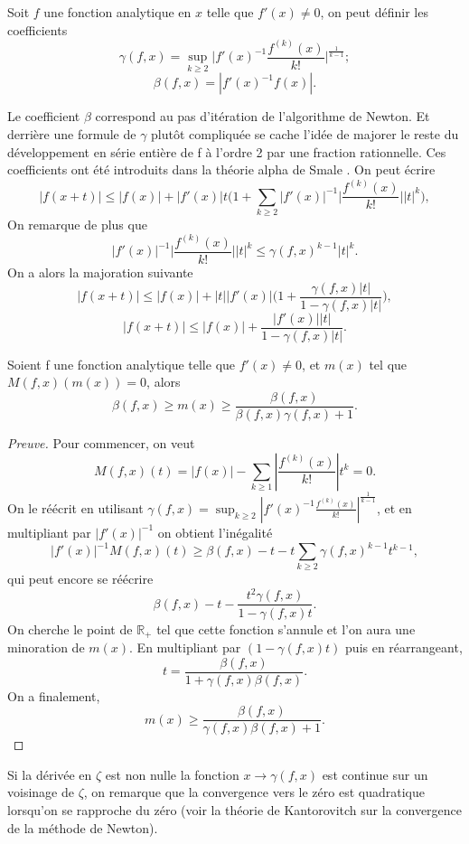 \documentclass[a4paper,10pt]{article}
\begin{document}
	\begin{definition}
		Soit $f$ une fonction analytique en $x$ telle que $f'(x)\neq0$, on peut définir les coefficients 
		\[\gamma(f,x)=\sup_{k \geq 2}\Big|f'(x)^{-1}\frac{f^{(k)}(x)}{k!}\Big|^{\frac{1}{k-1}};\]
		\[\beta(f,x)=|f'(x)^{-1}f(x)|.\]
	\end{definition}
	Le coefficient $\beta$ correspond au pas d'itération de l'algorithme de Newton. 
	Et derrière une formule de $\gamma$ plutôt compliquée se cache l'idée de majorer le reste du développement en série entière de f à l'ordre 2 par une fraction rationnelle. Ces coefficients ont été introduits dans la théorie alpha de Smale \cite{dedieu2006points}.
	On peut écrire 
	\[|f(x+t)|\leq |f(x)|+|f'(x)|t\Big(1+\sum_{k\geq2}|f'(x)|^{-1}\Big| \frac{f^{(k)}(x)}{k!}\Big||t|^k\Big),\]
	On remarque de plus que 
	\[|f'(x)|^{-1}\Big|\frac{f^{(k)}(x)}{k!}\Big||t|^k \leq \gamma(f,x)^{k-1}|t|^k.\]
	On a alors la majoration suivante
	\[|f(x+t)|\leq |f(x)|+|t||f'(x)|\Big(1+\frac{\gamma(f,x) |t|}{1-\gamma(f,x) |t|}\Big),\]
	\[|f(x+t)|\leq |f(x)|+\frac{|f'(x)||t|}{1-\gamma(f,x) |t|}.\]
	\begin{proposition}
		Soient f une fonction analytique telle que $f'(x)\neq 0$, et $m(x)$ tel que $M(f,x)(m(x))=0$, alors
		\[\beta(f,x) \geq m(x)\geq\frac{\beta(f,x)}{\beta(f,x)\gamma(f,x)+1}.\]
	\end{proposition}
	\begin{proof}[Preuve]
		
		Pour commencer, on veut  
		\[M(f,x)(t)=|f(x)|-\sum_{k\geq1}|\frac{f^{(k)}(x)}{k!}|t^{k}=0.\]
		On le réécrit en utilisant $\gamma(f,x)=\sup_{k \geq 2}|f'(x)^{-1}\frac{f^{(k)}(x)}{k!}|^{\frac{1}{k-1}}$, et en multipliant par $|f'(x)|^{-1}$ on obtient l'inégalité
		\[|f'(x)|^{-1}M(f,x)(t)\geq \beta(f,x)-t-t\sum_{k\geq2}\gamma(f,x)^{k-1}t^{k-1},\]
		qui peut encore se réécrire
		\[\beta(f,x)-t-\frac{t^2\gamma(f,x)}{1-\gamma(f,x) t}.\]
		On cherche le point de $\mathbb{R}_+$ tel que cette fonction s'annule et l'on aura une minoration de $m(x)$. En multipliant par $(1-\gamma(f,x) t)$ puis en réarrangeant,
		\[t=\frac{\beta(f,x)}{1+\gamma(f,x) \beta(f,x)}.\]
		On a finalement,
		\[m(x)\geq\frac{\beta(f,x)}{\gamma(f,x) \beta(f,x)+1}.\]
	\end{proof}
	Si la dérivée en $\zeta$ est non nulle la fonction $x\rightarrow \gamma(f,x)$ est continue sur un voisinage de $\zeta$, on remarque que la convergence vers le zéro est quadratique lorsqu'on se rapproche du zéro (voir la théorie de Kantorovitch \cite{dedieu2006points} sur la convergence de la méthode de Newton).
	
\end{document}
